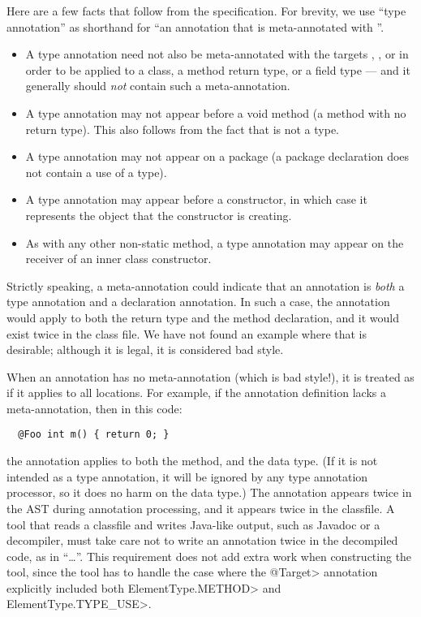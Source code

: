 \documentclass[10pt]{article}
\begin{document}
Here are a few facts that follow from the specification.  For brevity, we
use ``type annotation'' as shorthand for ``an annotation that is
meta-annotated with ''.
\begin{itemize}
\item
  A type annotation need not also be meta-annotated with the targets
  , , or
   in order to be applied to a class, a method
  return type, or a field type --- and it generally should \emph{not}
  contain such a  meta-annotation.
\item
  A type annotation may not appear before a void method (a method with no
  return type).  This also follows from the fact that  is not a
  type.
\item
  A type annotation may not appear on a package (a package declaration does
  not contain a use of a type).
\item
  A type annotation may appear before a constructor, in which case it
  represents the object that the constructor is creating.
\item
  As with any other non-static method, a type annotation may
  appear on the receiver of an inner class constructor.
\end{itemize}


Strictly speaking, a  meta-annotation could indicate that an
annotation is \emph{both} a type annotation and a declaration annotation.  In
such a case, the annotation would apply to both the return type and the
method declaration, and it would exist twice in the class file.  We have
not found an example where that is desirable; although it is legal, it is
considered bad style.


When an annotation has no  meta-annotation (which is bad
style!), it is treated as if it applies to all locations.
%
For example, if the  annotation definition lacks a
 meta-annotation, then in this code:

\begin{Verbatim}
  @Foo int m() { return 0; }
\end{Verbatim}

\noindent
the  annotation applies to both the  method, and the
 data type.  (If it is not intended as a type annotation, it will
be ignored by any type annotation processor, so it does no harm on the
 data type.)  The  annotation appears twice in the AST
during annotation processing, and it appears twice in the classfile.
A tool that reads a classfile and writes Java-like output, such as Javadoc
or a decompiler, must take care not to write an annotation twice in the
decompiled code, as in ``\ldots''.
This requirement does
not add extra work when constructing the tool, since the tool has to handle
the case where the \<@Target> annotation explicitly included both
\<ElementType.METHOD> and \<ElementType.TYPE\_USE>.
\end{document}
